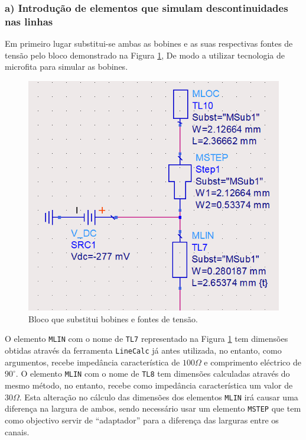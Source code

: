 \documentclass[11pt]{article}
\numberwithin{equation}{section}
\begin{document}
\subsubsection{a) Introdução de elementos que simulam descontinuidades nas linhas}

Em primeiro lugar substitui-se ambas as bobines  e as suas respectivas fontes de tensão pelo bloco demonstrado na Figura \ref{fig:bobine}, De modo a utilizar tecnologia de microfita para simular as bobines. 

\begin{figure}[H]
	\centering
	\includegraphics[keepaspectratio=true, scale=0.45]{exps/bobine}
	\vspace{-0.5em}
	\caption{Bloco que substitui bobines e fontes de tensão.}
	\vspace{-0.8em}
	\label{fig:bobine}
\end{figure}

O elemento \texttt{MLIN} com o nome de \texttt{TL7} representado na Figura \ref{fig:bobine} tem dimensões obtidas através da ferramenta \texttt{LineCalc} já antes utilizada, no entanto, como argumentos, recebe impedância característica de $100 \Omega$ e comprimento eléctrico de $90^{\circ}$. O elemento \texttt{MLIN} com o nome de \texttt{TL8} tem dimensões calculadas através do mesmo método, no entanto, recebe como impedância característica um valor de $30 \Omega$. Esta alteração no cálculo das dimensões dos elementos \texttt{MLIN} irá causar uma diferença na largura de ambos, sendo necessário usar um elemento \texttt{MSTEP} que tem como objectivo servir de ``adaptador'' para a diferença das larguras entre os canais.
\end{document}

